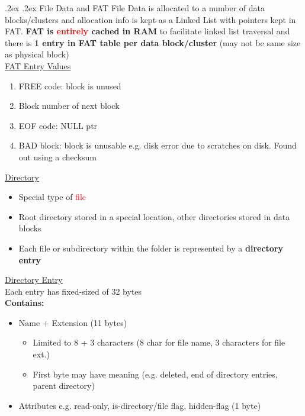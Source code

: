 \documentclass[13pt,landscape,a4paper]{article}
\makeatletter
\newcommand\red[1]{\textcolor{red}{#1}}
\renewcommand{\subsubsection}{\@startsection{subsubsection}{1}{0mm}%
    {.2ex}%
    {.2ex}%
    {\rmfamily\bfseries}}
\makeatother
\begin{document}
\begin{multicols*}{3}
        \subsubsection{File Data and FAT}
        File Data is allocated to a number of data blocks/clusters and allocation info is kept as a Linked List with pointers kept in FAT. \textbf{FAT is \red{entirely} cached in RAM} to facilitate linked list traversal and there is \textbf{1 entry in FAT table per data block/cluster} (may not be same size as physical block)\\
        \underline{FAT Entry Values}\\
        \begin{enumerate}
            \item FREE code: block is unused
            \item Block number of next block
            \item EOF code: NULL ptr
            \item BAD block: block is unusable e.g. disk error due to scratches on disk. Found out using a checksum
        \end{enumerate}
        \underline{Directory}
        \begin{itemize}
            \item Special type of \red{file}
            \item Root directory stored in a special location, other directories stored in data blocks
            \item Each file or subdirectory within the folder is represented by a \textbf{directory entry}
        \end{itemize}
        \underline{Directory Entry}\\
        Each entry has fixed-sized of 32 bytes\\
        \textbf{Contains:}
        \begin{itemize}
            \item Name + Extension (11 bytes)
            \begin{itemize}
                \item Limited to 8 + 3 characters (8 char for file name, 3 characters for file ext.)
                \item First byte may have meaning (e.g. deleted, end of directory entries, parent directory)
            \end{itemize}
            \item Attributes e.g. read-only, is-directory/file flag, hidden-flag (1 byte)

\end{itemize}
\end{multicols*}
\end{document}
